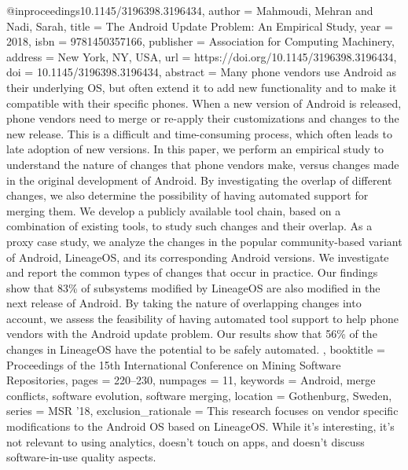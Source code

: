 
@inproceedings{10.1145/3196398.3196434,
  author = {Mahmoudi, Mehran and Nadi, Sarah},
  title = {The Android Update Problem: An Empirical Study},
  year = {2018},
  isbn = {9781450357166},
  publisher = {Association for Computing Machinery},
  address = {New York, NY, USA},
  url = {https://doi.org/10.1145/3196398.3196434},
  doi = {10.1145/3196398.3196434},
  abstract = {
    Many phone vendors use Android as their underlying OS, but often extend it to add new functionality and to make it compatible with their specific phones. When a new version of Android is released, phone vendors need to merge or re-apply their customizations and changes to the new release. This is a difficult and time-consuming process, which often leads to late adoption of new versions. In this paper, we perform an empirical study to understand the nature of changes that phone vendors make, versus changes made in the original development of Android. By investigating the overlap of different changes, we also determine the possibility of having automated support for merging them. We develop a publicly available tool chain, based on a combination of existing tools, to study such changes and their overlap. As a proxy case study, we analyze the changes in the popular community-based variant of Android, LineageOS, and its corresponding Android versions. We investigate and report the common types of changes that occur in practice. Our findings show that 83\% of subsystems modified by LineageOS are also modified in the next release of Android. By taking the nature of overlapping changes into account, we assess the feasibility of having automated tool support to help phone vendors with the Android update problem. Our results show that 56\% of the changes in LineageOS have the potential to be safely automated.
  },
  booktitle = {Proceedings of the 15th International Conference on Mining Software Repositories},
  pages = {220–230},
  numpages = {11},
  keywords = {Android, merge conflicts, software evolution, software merging},
  location = {Gothenburg, Sweden},
  series = {MSR '18},
  exclusion_rationale = {
    This research focuses on vendor specific modifications to the Android OS based on LineageOS. While it's interesting, it's not relevant to using analytics, doesn't touch on apps, and doesn't discuss software-in-use quality aspects.
  }
}

